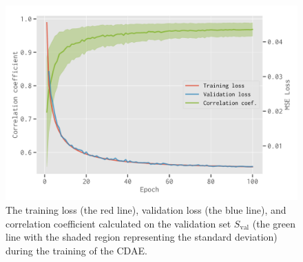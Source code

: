 \documentclass[letters,fleqn,usenatbib,onecolumn]{mnras}
\newcommand{\R}[1]{\mathrm{#1}}
\begin{document}
\begin{figure}
  \centering
  \includegraphics[width=\myfigwidth]{cdae-train}
  \caption{\label{fig:train}%
    The training loss (the red line), validation loss (the blue line),
    and correlation coefficient calculated on the validation set
    $S_{\R{val}}$ (the green line with the shaded region representing
    the standard deviation) during the training of the CDAE.
  }
\end{figure}
\end{document}
